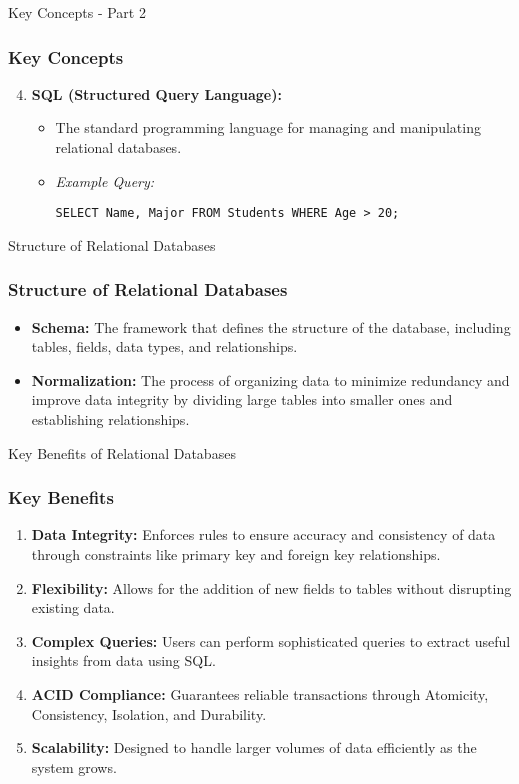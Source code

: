 \documentclass[aspectratio=169]{beamer}
\begin{document}
\begin{frame}[fragile]{Key Concepts - Part 2}
  \frametitle{Key Concepts}
  \begin{enumerate}
    \setcounter{enumi}{3}
    \item \textbf{SQL (Structured Query Language):}
      \begin{itemize}
        \item The standard programming language for managing and manipulating relational databases.
        \item \textit{Example Query:}
          \begin{lstlisting}[basicstyle=\ttfamily]
SELECT Name, Major FROM Students WHERE Age > 20;
          \end{lstlisting}
      \end{itemize}
  \end{enumerate}
\end{frame}

\begin{frame}[fragile]{Structure of Relational Databases}
  \frametitle{Structure of Relational Databases}
  \begin{itemize}
    \item \textbf{Schema:} The framework that defines the structure of the database, including tables, fields, data types, and relationships.
    \item \textbf{Normalization:} The process of organizing data to minimize redundancy and improve data integrity by dividing large tables into smaller ones and establishing relationships.
  \end{itemize}
\end{frame}

\begin{frame}[fragile]{Key Benefits of Relational Databases}
  \frametitle{Key Benefits}
  \begin{enumerate}
    \item \textbf{Data Integrity:} Enforces rules to ensure accuracy and consistency of data through constraints like primary key and foreign key relationships.
    \item \textbf{Flexibility:} Allows for the addition of new fields to tables without disrupting existing data.
    \item \textbf{Complex Queries:} Users can perform sophisticated queries to extract useful insights from data using SQL.
    \item \textbf{ACID Compliance:} Guarantees reliable transactions through Atomicity, Consistency, Isolation, and Durability.
    \item \textbf{Scalability:} Designed to handle larger volumes of data efficiently as the system grows.
  \end{enumerate}
\end{frame}
\end{document}
